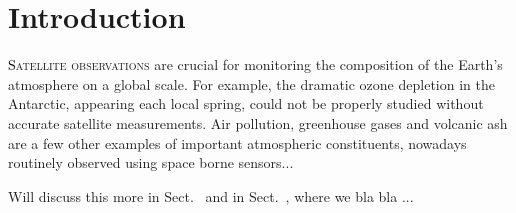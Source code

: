 \section{Introduction}

\lettrine[lraise=0.05, nindent=0em, slope=-.5em]{\textcolor{Black}{S}}{atellite observations} are crucial for monitoring 
the composition of the Earth's atmosphere on a global scale.
For example, the dramatic ozone depletion in the Antarctic, appearing each local spring, 
could not be properly studied without accurate satellite measurements. Air pollution, greenhouse gases and 
volcanic ash are a few other examples of important 
atmospheric constituents, nowadays routinely observed using space borne sensors...

Will discuss this more in \mbox{Sect.~} and in \mbox{Sect.~}, where we bla bla ...

